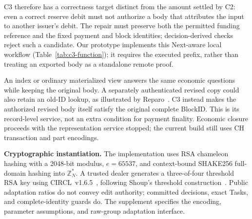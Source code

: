 C3 therefore has a correctness target distinct from the amount settled
by C2: even a correct reserve debit must not authorize a body that
attributes the input to another issuer's debit. The repair must preserve
both the permitted funding reference and the fixed payment and block
identities; decision-derived checks reject such a candidate.
Our prototype implements this Next-aware local workflow
(Table~\ref{tab:c3-function}); it requires the executed prefix, rather
than treating an exported body as a standalone remote proof.

An index or ordinary materialized view answers the same economic
questions while keeping the original body. A separately authenticated
revised copy could also retain an old-ID lookup, as illustrated by
Reparo~\cite{reparo}. C3 instead makes the authorized revised body
itself satisfy the original complete BlockID. This is its record-level
service, not an extra condition for payment finality.
Economic closure proceeds with the representation service stopped;
the current build still uses CH transaction and part encodings.

\noindent\textbf{Cryptographic instantiation.}
The implementation uses RSA chameleon hashing with a 2048-bit modulus,
$e=65537$, and context-bound SHAKE256 full-domain hashing into
$\mathbb Z_N^*$. A trusted dealer generates a three-of-four threshold RSA
key using CIRCL~v1.6.5~\cite{circl}, following Shoup's threshold
construction~\cite{shoup}. Public adaptation ratios do not convey edit
authority; committed decisions, exact Tasks, and complete-identity guards
do. The supplement specifies the encoding, parameter assumptions, and
raw-group adaptation interface.
